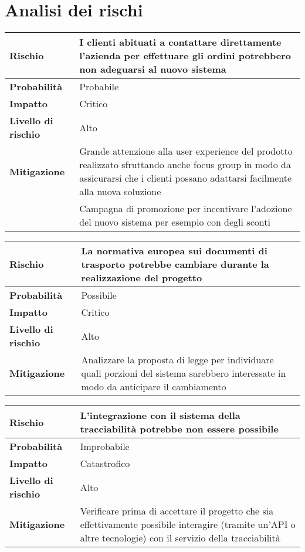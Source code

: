 \chapter{Analisi dei rischi}
\label{app:analisi-rischi}

\begin{table}[H]
  \begin{tabularx}{\textwidth}{lX}
    \toprule
    \textbf{Rischio} & \textbf{I clienti abituati a contattare direttamente l'azienda per effettuare gli ordini potrebbero non adeguarsi al nuovo sistema} \\
    \midrule
    \textbf{Probabilità} & Probabile \\
    \textbf{Impatto} & Critico \\
    \textbf{Livello di rischio} & Alto \\
    \textbf{Mitigazione} & Grande attenzione alla user experience del prodotto realizzato sfruttando anche focus group in modo da assicurarsi che i clienti possano adattarsi facilmente alla nuova soluzione \\
    & Campagna di promozione per incentivare l'adozione del nuovo sistema per esempio con degli sconti \\
    \bottomrule
  \end{tabularx}
\end{table}

\begin{table}[H]
  \begin{tabularx}{\textwidth}{lX}
    \toprule
    \textbf{Rischio} & \textbf{La normativa europea sui documenti di trasporto potrebbe cambiare durante la realizzazione del progetto} \\
    \midrule
    \textbf{Probabilità} & Possibile \\
    \textbf{Impatto} & Critico \\
    \textbf{Livello di rischio} & Alto \\
    \textbf{Mitigazione} & Analizzare la proposta di legge per individuare quali porzioni del sistema sarebbero interessate in modo da anticipare il cambiamento \\
    \bottomrule
  \end{tabularx}
\end{table}

\begin{table}[H]
  \begin{tabularx}{\textwidth}{lX}
    \toprule
    \textbf{Rischio} & \textbf{L'integrazione con il sistema della tracciabilità potrebbe non essere possibile} \\
    \midrule
    \textbf{Probabilità} & Improbabile \\
    \textbf{Impatto} & Catastrofico \\
    \textbf{Livello di rischio} & Alto \\
    \textbf{Mitigazione} & Verificare prima di accettare il progetto che sia effettivamente possibile interagire (tramite un'API o altre tecnologie) con il servizio della tracciabilità \\
    \bottomrule
  \end{tabularx}
\end{table}

